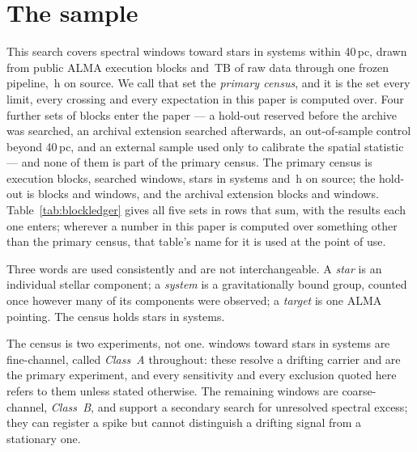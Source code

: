 \section{The sample}
\label{sec:sample}

This search covers \NWindows{} spectral windows toward \NStars{}
stars in \NSystems{} systems within 40\,pc, drawn from \NEB{}
public ALMA execution blocks and \TotalDataTB\,TB of raw data through one
frozen pipeline, \LdgCensusHours\,h on source. We call that set the
\emph{primary census}, and it is the set every limit, every crossing and
every expectation in this paper is computed over. Four further sets of blocks
enter the paper --- a hold-out reserved before the archive was searched, an
archival extension searched afterwards, an out-of-sample control beyond
40\,pc, and an external sample used only to calibrate the spatial statistic
--- and none of them is part of the primary census.
The primary census is \LdgCensusEB{} execution blocks, \LdgCensusWin{}
searched windows, \LdgCensusStars{} stars in \LdgCensusSys{} systems and
\LdgCensusHours\,h on source; the hold-out is \LdgHoldEB{} blocks and
\LdgHoldWin{} windows, and the archival extension \LdgExtEB{} blocks and
\LdgExtWin{} windows.
Table~\ref{tab:blockledger} gives all five sets in rows that sum, with the
results each one enters; wherever a number in this paper is computed over
something other than the primary census, that table's name for it is used at
the point of use.

Three words are used consistently and are not interchangeable. A \emph{star}
is an individual stellar component; a \emph{system} is a gravitationally
bound group, counted once however many of its components were observed; a
\emph{target} is one ALMA pointing. The census holds \NStars{} stars
in \NSystems{} systems.

The census is two experiments, not one. \NWinA{} windows toward
\LdgClassAStars{} stars in \NSysClassA{} systems are fine-channel, called
\emph{Class~A} throughout: these resolve a drifting carrier and are the
primary experiment, and every sensitivity and every exclusion quoted here
refers to them unless stated otherwise. The remaining \NWinB{} windows
are coarse-channel, \emph{Class~B}, and support a secondary search for
unresolved spectral excess; they can register a spike but cannot distinguish
a drifting signal from a stationary one.

